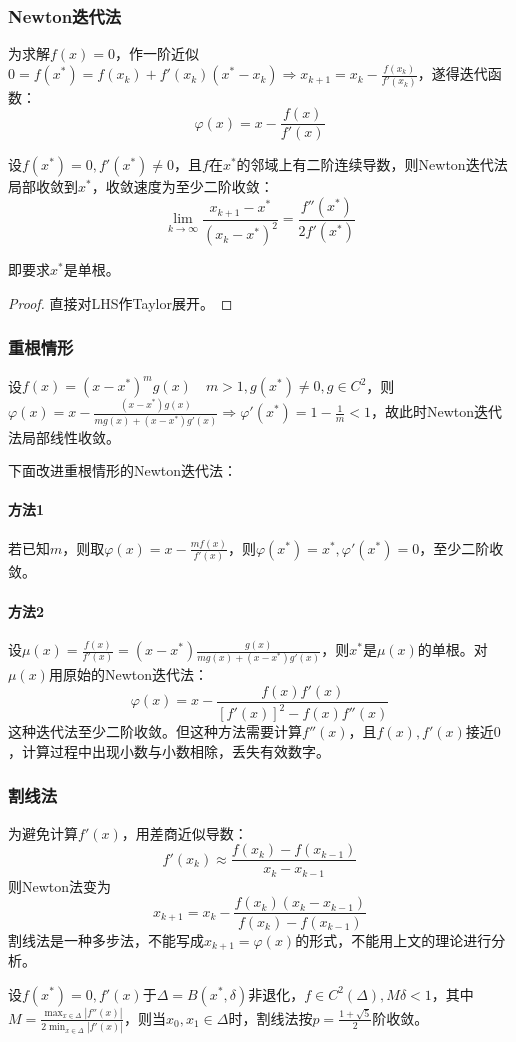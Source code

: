 \documentclass{ctexart}
\begin{document}
\subsubsection{Newton迭代法}
为求解$f(x)=0$，作一阶近似$0=f(x^*)=f(x_k)+f'(x_k)(x^*-x_k)\Rightarrow x_{k+1}=x_k-\frac{f(x_k)}{f'(x_k)}$，遂得迭代函数：
\[\varphi(x)=x-\frac{f(x)}{f'(x)}\]

\begin{Thm}
设$f(x^*)=0,f'(x^*)\neq 0$，且$f$在$x^*$的邻域上有二阶连续导数，则Newton迭代法局部收敛到$x^*$，收敛速度为至少二阶收敛：
\[\lim_{k\to\infty}\frac{x_{k+1}-x^*}{(x_k-x^*)^2}=\frac{f''(x^*)}{2f'(x^*)}\]
\end{Thm}
即要求$x^*$是单根。

\begin{proof}
直接对LHS作Taylor展开。
\end{proof}

\subsubsection{重根情形}
设$f(x)=(x-x^*)^mg(x)\quad m>1,g(x^*)\neq 0,g\in C^2$，则$\varphi(x)=x-\frac{(x-x^*)g(x)}{mg(x)+(x-x^*)g'(x)}\Rightarrow \varphi'(x^*)=1-\frac{1}{m}<1$，故此时Newton迭代法局部线性收敛。

下面改进重根情形的Newton迭代法：

\paragraph{方法1}若已知$m$，则取$\varphi(x)=x-\frac{mf(x)}{f'(x)}$，则$\varphi(x^*)=x^*,\varphi'(x^*)=0$，至少二阶收敛。

\paragraph{方法2}设$\mu(x)=\frac{f(x)}{f'(x)}=(x-x^*)\frac{g(x)}{mg(x)+(x-x^*)g'(x)}$，则$x^*$是$\mu(x)$的单根。对$\mu(x)$用原始的Newton迭代法：
\[\varphi(x)=x-\frac{f(x)f'(x)}{[f'(x)]^2-f(x)f''(x)}\]
这种迭代法至少二阶收敛。但这种方法需要计算$f''(x)$，且$f(x),f'(x)$接近$0$，计算过程中出现小数与小数相除，丢失有效数字。

\subsubsection{割线法}
为避免计算$f'(x)$，用差商近似导数：
\[f'(x_k)\approx \frac{f(x_k)-f(x_{k-1})}{x_k-x_{k-1}}\]
则Newton法变为
\[x_{k+1}=x_k-\frac{f(x_k)(x_{k}-x_{k-1})}{f(x_k)-f(x_{k-1})}\]
割线法是一种多步法，不能写成$x_{k+1}=\varphi(x)$的形式，不能用上文的理论进行分析。
\begin{Thm}
设$f(x^*)=0,f'(x)$于$\Delta=B(x^*,\delta)$非退化，$f\in C^2(\Delta),M\delta<1$，其中$M=\frac{\max_{x\in \Delta}|f''(x)|}{2\min_{x\in \Delta}|f'(x)|}$，则当$x_0,x_1\in \Delta$时，割线法按$p=\frac{1+\sqrt{5}}{2}$阶收敛。
\end{Thm}
\end{document}
